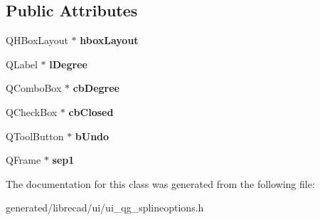 \subsection*{Public Attributes}
\begin{DoxyCompactItemize}
\item 
\hypertarget{classUi__QG__SplineOptions_a663c1b48c0f61bf9e9663bfff7fabb72}{Q\-H\-Box\-Layout $\ast$ {\bfseries hbox\-Layout}}\label{classUi__QG__SplineOptions_a663c1b48c0f61bf9e9663bfff7fabb72}

\item 
\hypertarget{classUi__QG__SplineOptions_a08ab75ae58406cff170389a7221e12f2}{Q\-Label $\ast$ {\bfseries l\-Degree}}\label{classUi__QG__SplineOptions_a08ab75ae58406cff170389a7221e12f2}

\item 
\hypertarget{classUi__QG__SplineOptions_a211e861ddf5a47aaea3ed7f8ccfb83ca}{Q\-Combo\-Box $\ast$ {\bfseries cb\-Degree}}\label{classUi__QG__SplineOptions_a211e861ddf5a47aaea3ed7f8ccfb83ca}

\item 
\hypertarget{classUi__QG__SplineOptions_a3f21a30da043b903586bad8bb958aab6}{Q\-Check\-Box $\ast$ {\bfseries cb\-Closed}}\label{classUi__QG__SplineOptions_a3f21a30da043b903586bad8bb958aab6}

\item 
\hypertarget{classUi__QG__SplineOptions_a7ae001828f25495691acbb89d4c53186}{Q\-Tool\-Button $\ast$ {\bfseries b\-Undo}}\label{classUi__QG__SplineOptions_a7ae001828f25495691acbb89d4c53186}

\item 
\hypertarget{classUi__QG__SplineOptions_adf36d86cbaaaf2b3b8683e8c0f4119f9}{Q\-Frame $\ast$ {\bfseries sep1}}\label{classUi__QG__SplineOptions_adf36d86cbaaaf2b3b8683e8c0f4119f9}

\end{DoxyCompactItemize}


The documentation for this class was generated from the following file\-:\begin{DoxyCompactItemize}
\item 
generated/librecad/ui/ui\-\_\-qg\-\_\-splineoptions.\-h\end{DoxyCompactItemize}
